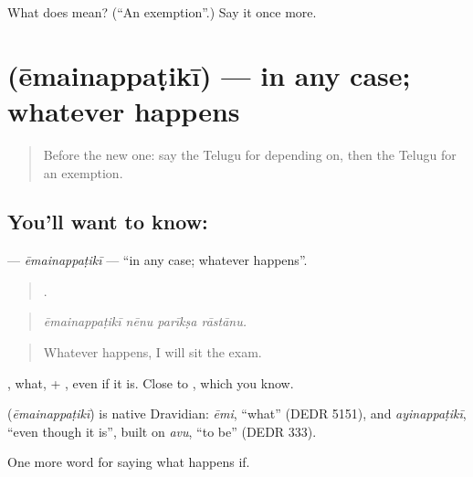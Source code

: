 \begin{tcolorbox}[breakable,colback=teal!4,colframe=teal!35!black,title={Before you move on}]
What does  mean? (\textquotedblleft{}An exemption\textquotedblright{}.) Say it once more.
\end{tcolorbox}
\section[\texorpdfstring{\te{ఏమైనప్పటికీ} (ēmainappaṭikī)}{ఏమైనప్పటికీ (ēmainappaṭikī)}]{ (ēmainappaṭikī) — in any case; whatever happens}

\label{lesson:TE-C419-emainappatiki}



\begin{quote}
Before the new one: say the Telugu for depending on, then the Telugu for an exemption.
\end{quote}

\subsection*{You'll want to know: }
\textbf{} — \emph{ēmainappaṭikī} — \textquotedblleft{}in any case; whatever happens\textquotedblright{}.

\begin{quote}
   .
\end{quote}

\begin{quote}
\emph{ēmainappaṭikī nēnu parīkṣa rāstānu.}
\end{quote}

\begin{quote}
Whatever happens, I will sit the exam.
\end{quote}

, what, + , even if it is. Close to , which you know.

\begin{cousinweb}
\textbf{} (\emph{ēmainappaṭikī}) is native Dravidian: \emph{ēmi}, \textquotedblleft{}what\textquotedblright{} (DEDR 5151), and \emph{ayinappaṭikī}, \textquotedblleft{}even though it is\textquotedblright{}, built on \emph{avu}, \textquotedblleft{}to be\textquotedblright{} (DEDR 333).
\end{cousinweb}

\begin{grammarlens}[title={What you've built}]
One more word for saying what happens if.
\end{grammarlens}

